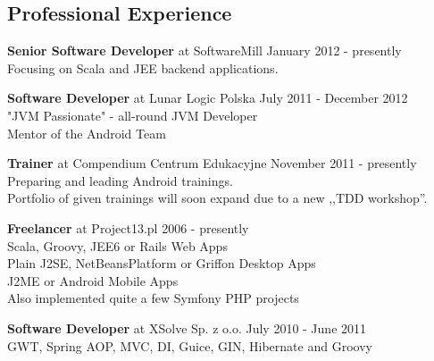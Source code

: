\documentclass{res}
\begin{document}
 
 
 
\address{{\bf Konrad Malawski} \\
	10.01.1989, Vienna \\
	mobile: +48 602 36 66 55 \\
	}
\address{
	email: konrad.malawski@project13.pl \\
    \textbf{linkedin: linkedin.com/in/konradmalawski} \\
	\textbf{github: github.com/ktoso} \\
	blog: \url{blog.project13.pl} \\
}

\begin{resume} 

\section{Professional Experience}
{\bf Senior Software Developer} at SoftwareMill \hfill January 2012 - presently \\ 
    Focusing on Scala and JEE backend applications.

{\bf Software Developer} at Lunar Logic Polska \hfill July 2011 - December 2012 \\ 
    "JVM Passionate" - all-round JVM Developer \\ 
    Mentor of the Android Team 

{\bf Trainer} at Compendium Centrum Edukacyjne \hfill November 2011 - presently \\ 
	Preparing and leading Android trainings. \\
	Portfolio of given trainings will soon expand due to a new ,,TDD workshop''. 

{\bf Freelancer} at Project13.pl \hfill 2006 - presently\\
	Scala, Groovy, JEE6 or Rails Web Apps \\
	Plain J2SE, NetBeansPlatform or Griffon Desktop Apps \\
	J2ME or Android Mobile Apps \\
	Also implemented quite a few Symfony PHP projects


{\bf Software Developer} at XSolve Sp. z o.o. \hfill July 2010 - June 2011\\
	GWT, Spring {AOP, MVC, DI}, Guice, GIN, Hibernate and Groovy


\end{resume}
\end{document}
